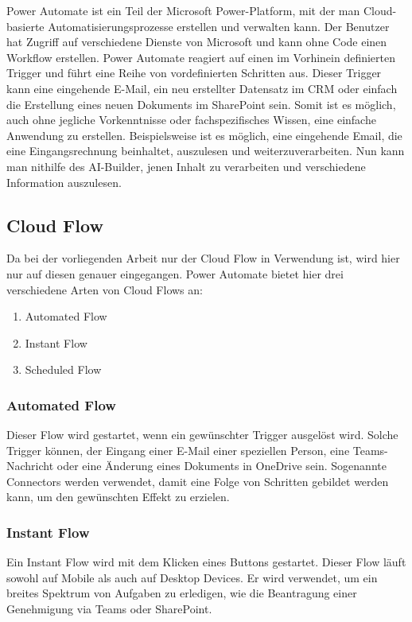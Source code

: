 Power Automate ist ein Teil der Microsoft Power-Platform, mit der man Cloud-basierte Automatisierungsprozesse erstellen und verwalten kann. Der Benutzer hat Zugriff auf verschiedene Dienste von Microsoft und kann ohne Code einen Workflow erstellen. Power Automate reagiert auf einen im Vorhinein definierten Trigger und führt eine Reihe von vordefinierten Schritten aus. Dieser Trigger kann eine eingehende E-Mail, ein neu erstellter Datensatz im CRM oder einfach die Erstellung eines neuen Dokuments im SharePoint sein. Somit ist es möglich, auch ohne jegliche Vorkenntnisse oder fachspezifisches Wissen, eine einfache Anwendung zu erstellen. Beispielsweise ist es möglich, eine eingehende Email, die eine Eingangsrechnung beinhaltet, auszulesen und weiterzuverarbeiten. Nun kann man nithilfe des AI-Builder, jenen Inhalt zu verarbeiten und verschiedene Information auszulesen.

\subsection{Cloud Flow}
Da bei der vorliegenden Arbeit nur der Cloud Flow in Verwendung ist, wird hier nur auf diesen genauer eingegangen. Power Automate bietet hier drei verschiedene Arten von Cloud Flows an:

\begin{enumerate}
    \item Automated Flow
    \item Instant Flow
    \item Scheduled Flow
\end{enumerate}

\subsubsection{Automated Flow}
Dieser Flow wird gestartet, wenn ein gewünschter Trigger ausgelöst wird. Solche Trigger können, der Eingang einer E-Mail einer speziellen Person, eine Teams-Nachricht oder eine Änderung eines Dokuments in OneDrive sein. Sogenannte Connectors werden verwendet, damit eine Folge von Schritten gebildet werden kann, um den gewünschten Effekt zu erzielen.

\subsubsection{Instant Flow}
Ein Instant Flow wird mit dem Klicken eines Buttons gestartet. Dieser Flow läuft sowohl auf Mobile als auch auf Desktop Devices. Er wird verwendet, um ein breites Spektrum von Aufgaben zu erledigen, wie die Beantragung einer Genehmigung via Teams oder SharePoint.

